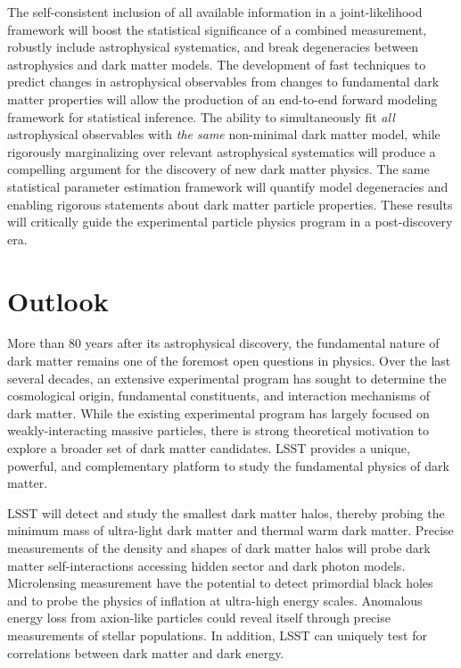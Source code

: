 The self-consistent inclusion of all available information in a joint-likelihood framework will boost the statistical significance of a combined measurement, robustly include astrophysical systematics, and break degeneracies between astrophysics and dark matter models.
The development of fast techniques to predict changes in astrophysical observables from changes to fundamental dark matter properties will allow the production of an end-to-end forward modeling framework for statistical inference.
The ability to simultaneously fit \textit{all} astrophysical observables with \emph{the same} non-minimal dark matter model, while rigorously marginalizing over relevant astrophysical systematics will produce a compelling argument for the discovery of new dark matter physics.
The same statistical parameter estimation framework will quantify model degeneracies and enabling rigorous statements about dark matter particle properties.
These results will critically guide the experimental particle physics program in a post-discovery era.


\section{Outlook}
\label{sec:outlook}

More than 80 years after its astrophysical discovery, the fundamental nature of dark matter remains one of the foremost open questions in physics.
Over the last several decades, an extensive experimental program has sought to determine the cosmological origin, fundamental constituents, and interaction mechanisms of dark matter. 
While the existing experimental program has largely focused on weakly-interacting massive particles, there is strong theoretical motivation to explore a broader set of dark matter candidates.
LSST provides a unique, powerful, and complementary platform to study the fundamental physics of dark matter.

LSST will detect and study the smallest dark matter halos, thereby probing the minimum mass of ultra-light dark matter and thermal warm dark matter.
Precise measurements of the density and shapes of dark matter halos will probe dark matter self-interactions accessing hidden sector and dark photon models.
Microlensing measurement have the potential to detect primordial black holes and to probe the physics of inflation at ultra-high energy scales.
Anomalous energy loss from axion-like particles could reveal itself through precise measurements of stellar populations.
In addition, LSST can uniquely test for correlations between dark matter and dark energy.

